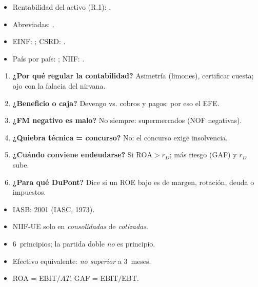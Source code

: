 \documentclass{article}
\begin{document}
\begin{columnas}
\anexorepaso
{}
\begin{itemize}
\item Rentabilidad del activo (R.1): .
\item Abreviadas: .
\item EINF: ; CSRD: .
\item País por país: ; NIIF: .
\end{itemize}
\begin{enumerate}
\item \textbf{¿Por qué regular la contabilidad?} Asimetría (limones), certificar cuesta; ojo con la falacia del nirvana.
\item \textbf{¿Beneficio o caja?} Devengo vs. cobros y pagos: por eso el EFE.
\item \textbf{¿FM negativo es malo?} No siempre: supermercados (NOF negativas).
\item \textbf{¿Quiebra técnica = concurso?} No: el concurso exige insolvencia.
\item \textbf{¿Cuándo conviene endeudarse?} Si $\mathrm{ROA}>r_D$; más riesgo (GAF) y $r_D$ sube.
\item \textbf{¿Para qué DuPont?} Dice si un ROE bajo es de margen, rotación, deuda o impuestos.
\end{enumerate}
\begin{trampa}
\begin{itemize}
\item IASB: 2001 (IASC, 1973).
\item NIIF-UE solo en \emph{consolidadas} de \emph{cotizadas}.
\item 6~principios; la partida doble \emph{no} es principio.
\item Efectivo equivalente: \emph{no superior} a 3~meses.
\item ROA = EBIT$/AT$; GAF = EBIT$/$EBT.
\end{itemize}
\end{trampa}

\end{columnas}
\end{document}
